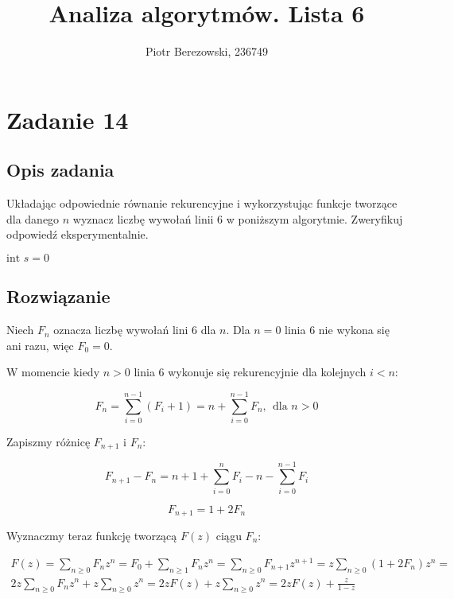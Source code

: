 \documentclass{article}
\title{Analiza algorytmów. Lista 6}
\author{Piotr Berezowski, 236749}
\newenvironment{pseudokod}[1][htb]{
	\renewcommand{\algorithmcfname}{}
	\begin{algorithm}[#1]%
	}{
\end{algorithm}
}
\begin{document}
	\maketitle
	\newpage
    

	\section{Zadanie 14}
	\subsection{Opis zadania}
    Układając odpowiednie równanie rekurencyjne i wykorzystując funkcje tworzące dla danego $n$ wyznacz liczbę wywołań linii $6$ w poniższym 
    algorytmie. Zweryfikuj odpowiedź eksperymentalnie.

    \begin{pseudokod}[H]
        \caption{$f(\text{int } n)$}

        $\text{int } s = 0$\;
         {
        }

    \end{pseudokod}

    \subsection{Rozwiązanie}

    Niech $F_{n}$ oznacza liczbę wywołań lini $6$ dla $n$. Dla $n = 0$ linia $6$ nie wykona się ani razu, więc $F_{0} = 0$. 

    W momencie kiedy $n > 0$ linia $6$ wykonuje się rekurencyjnie dla kolejnych $i < n$:

    $$F_{n} = \sum_{i=0}^{n-1} (F_{i} + 1) = n + \sum_{i=0}^{n-1} F_{n}, \ \ \text{dla } n > 0$$

    Zapiszmy różnicę $F_{n+1}$ i $F_{n}$:

    $$F_{n+1} - F_{n} = n + 1 + \sum_{i=0}^{n} F_{i} - n - \sum_{i=0}^{n-1} F_{i}$$

    $$F_{n+1} = 1 + 2 F_{n}$$

    Wyznaczmy teraz funkcję tworzącą $F(z)$ ciągu $F_{n}$:

    \begin{equation*}
        \begin{split}
            F(z) = \sum_{n \geq 0} F_{n} z^{n} = F_{0} + \sum_{n \geq 1} F_{n} z^{n} = \sum_{n \geq 0} F_{n+1} z^{n+1} = 
                z \sum_{n \geq 0} (1 + 2 F_{n}) z^{n} = \\ 
                2 z \sum_{n \geq 0} F_{n} z^{n} + z \sum_{n \geq 0} z^{n} = 
                2 z F(z) + z \sum_{n \geq 0} z^{n} = 2 z F(z) + \frac{z}{1 - z}
        \end{split}
    \end{equation*}
\end{document}
